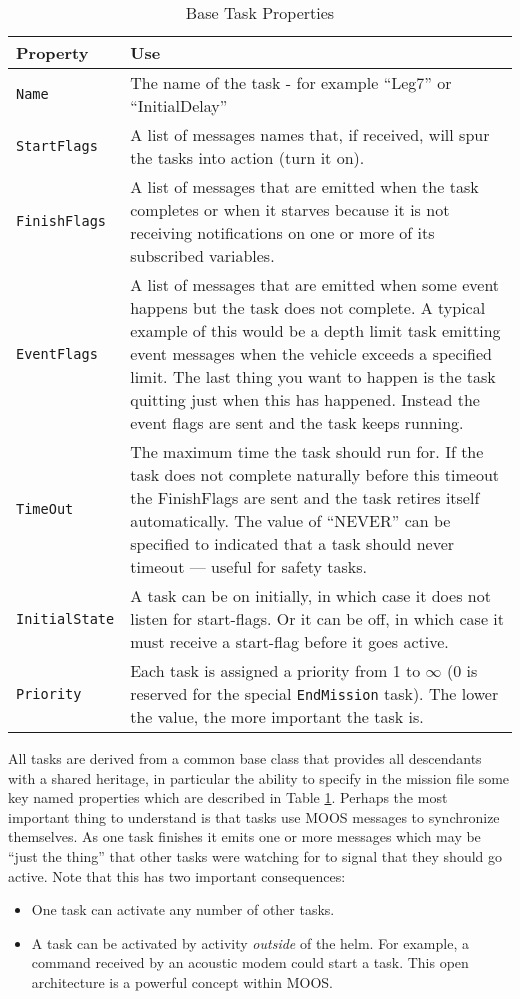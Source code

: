 \documentclass[a4paper,10pt]{article}
\newcommand{\Code}[1]{\texttt{#1} }
\newcommand{\code}[1]{\Code{#1} }
\begin{document}
\begin{table}[ht]\label{tab:TaskProps}
\caption{Base Task Properties}
 \centering
\begin{tabular}{p{}|p{} } %
{\textbf{Property}} & {\textbf{Use}} \\ \hline %
  \code{Name} & The name of the task - for example ``Leg7'' or
  ``InitialDelay''  \\ %
  \code{StartFlags} & A list of  messages names that, if received, will spur the tasks into action (turn it
  on).
  \\ %
  \code{FinishFlags} & A list of messages that are emitted when the task
  completes or when it starves because it is not receiving
  notifications on one or more of its subscribed variables.
  \\ %
  \code{EventFlags} & A list of messages that are emitted when some event happens but the task does not complete. A
  typical example of this would be a depth limit task emitting event messages when the vehicle exceeds a specified limit. The last
  thing you want to happen is the task quitting just when this has happened. Instead the event flags are sent and the task
  keeps running. \\ %
  \code{TimeOut} & The maximum time the task should run for. If the task does not complete naturally before this
  timeout the FinishFlags are sent and the task retires itself automatically. The value of ``NEVER'' can be specified to
  indicated that a task should never timeout --- useful for safety tasks. \\ %
  \code{InitialState} & A task can be on initially, in which case it does not listen for start-flags. Or it can be off, in which case it
  must receive a start-flag before it goes active. \\ %
  \code{Priority} & Each task is assigned a priority from 1 to $\infty$ (0 is reserved for the special \code{EndMission} task). The lower
  the value, the more important the task is.    \\ %
\end{tabular}
\end{table}

All tasks are derived from a common base class that provides all
descendants with a shared heritage, in particular the ability to
specify in the mission file some key named properties which are
described in Table \ref{tab:TaskProps}. Perhaps the most important
thing to understand is that tasks use MOOS messages to synchronize
themselves. As one task finishes it emits one or more messages
which may be ``just the thing'' that other tasks were watching for
to signal that they should go active. Note that this has two
important consequences:
\begin{itemize}
\item One task can activate any number of other tasks.
\item A task can be activated by activity {\it{outside}} of the
helm. For example, a command received by an acoustic modem could
start a task. This open architecture is a powerful concept within
MOOS.
\end{itemize}
\end{document}
